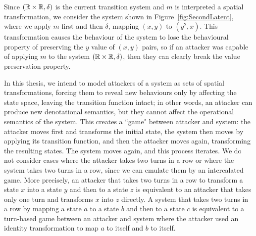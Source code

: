 Since $(\mathbb{R}\times\mathbb{R}, \delta)$ is the current transition system and $m$ is interpreted a spatial transformation, we consider the system shown in Figure~\ref{fig:SecondLatent}, where we apply $m$ first and then $\delta$, mapping $(x,y)$ to $(y^2,x)$. This transformation causes the behaviour of the system to lose the behavioural property of preserving the $y$ value of $(x,y)$ pairs, so if an attacker was capable of applying $m$ to the system $(\mathbb{R}\times\mathbb{R}, \delta)$, then they can clearly break the value preservation property. 


In this thesis, we intend to model attackers of a system as sets of spatial transformations, forcing them to reveal new behaviours only by affecting the state space, leaving the transition function intact; in other words, an attacker can produce new denotational semantics, but they cannot affect the operational semantics of the system. This creates a ``game" between attacker and system: the attacker moves first and transforms the initial state, the system then moves by applying its transition function, and then the attacker moves again, transforming the resulting states. The system moves again, and this process iterates. We do not consider cases where the attacker takes two turns in a row or where the system takes two turns in a row, since we can emulate them by an intercalated game. More precisely, an attacker that takes two turns in a row to transform a state $x$ into a state $y$ and then to a state $z$ is equivalent to an attacker that takes only one turn and transforms $x$ into $z$ directly. A system that takes two turns in a row by mapping a state $a$ to a state $b$ and then to a state $c$ is equivalent to a turn-based game between an attacker and system where the attacker used an identity transformation to map $a$ to itself and $b$ to itself. 

